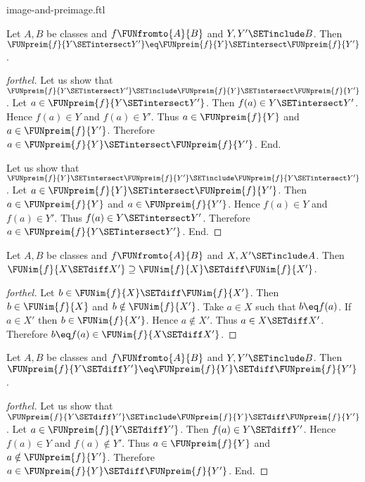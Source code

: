 \documentclass{naproche-library}
\begin{document}
\begin{smodule}[title=Computation Laws for Images and Preimages]{image-and-preimage.ftl}
\begin{proposition}[forthel,id=FOUNDATIONS_07_4021844428455936]
  Let $A, B$ be classes and $f \FUNfromto{A}{B}$ and $Y, Y' \SETinclude B$.
  Then $\FUNpreim{f}{Y \SETintersect Y'} \eq \FUNpreim{f}{Y} \SETintersect \FUNpreim{f}{Y'}$.
\end{proposition}
\begin{proof}[forthel]
  Let us show that $\FUNpreim{f}{Y \SETintersect Y'} \SETinclude \FUNpreim{f}{Y} \SETintersect \FUNpreim{f}{Y'}$.
    Let $a \in \FUNpreim{f}{Y \SETintersect Y'}$.
    Then $f(a) \in Y \SETintersect Y'$.
    Hence $f(a) \in Y$ and $f(a) \in Y'$.
    Thus $a \in \FUNpreim{f}{Y}$ and $a \in \FUNpreim{f}{Y'}$.
    Therefore $a \in \FUNpreim{f}{Y} \SETintersect \FUNpreim{f}{Y'}$.
  End.

  Let us show that $\FUNpreim{f}{Y} \SETintersect \FUNpreim{f}{Y'} \SETinclude \FUNpreim{f}{Y \SETintersect Y'}$.
    Let $a \in \FUNpreim{f}{Y} \SETintersect \FUNpreim{f}{Y'}$.
    Then $a \in \FUNpreim{f}{Y}$ and $a \in \FUNpreim{f}{Y'}$.
    Hence $f(a) \in Y$ and $f(a) \in Y'$.
    Thus $f(a) \in Y \SETintersect Y'$.
    Therefore $a \in \FUNpreim{f}{Y \SETintersect Y'}$.
  End.
\end{proof}

\begin{proposition}[forthel,id=FOUNDATIONS_07_8372256617005056]
  Let $A, B$ be classes and $f \FUNfromto{A}{B}$ and $X, X' \SETinclude A$.
  Then $\FUNim{f}{X \SETdiff X'} \supseteq \FUNim{f}{X} \SETdiff \FUNim{f}{X'}$.
\end{proposition}
\begin{proof}[forthel]
  Let $b \in \FUNim{f}{X} \SETdiff \FUNim{f}{X'}$.
  Then $b \in \FUNim{f}{X}$ and $b \notin \FUNim{f}{X'}$.
  Take $a \in X$ such that $b \eq f(a)$.
  If $a \in X'$ then $b \in \FUNim{f}{X'}$.
  Hence $a \notin X'$.
  Thus $a \in X \SETdiff X'$.
  Therefore $b \eq f(a) \in \FUNim{f}{X \SETdiff X'}$.
\end{proof}

\begin{proposition}[forthel,id=FOUNDATIONS_07_6552168641331200]
  Let $A, B$ be classes and $f \FUNfromto{A}{B}$ and $Y, Y' \SETinclude B$.
  Then $\FUNpreim{f}{Y \SETdiff Y'} \eq \FUNpreim{f}{Y} \SETdiff \FUNpreim{f}{Y'}$.
\end{proposition}
\begin{proof}[forthel]
  Let us show that $\FUNpreim{f}{Y \SETdiff Y'} \SETinclude \FUNpreim{f}{Y} \SETdiff \FUNpreim{f}{Y'}$.
    Let $a \in \FUNpreim{f}{Y \SETdiff Y'}$.
    Then $f(a) \in Y \SETdiff Y'$.
    Hence $f(a) \in Y$ and $f(a) \notin Y'$.
    Thus $a \in \FUNpreim{f}{Y}$ and $a \notin \FUNpreim{f}{Y'}$.
    Therefore $a \in \FUNpreim{f}{Y} \SETdiff \FUNpreim{f}{Y'}$.
  End.


\end{proof}
\end{smodule}
\end{document}
